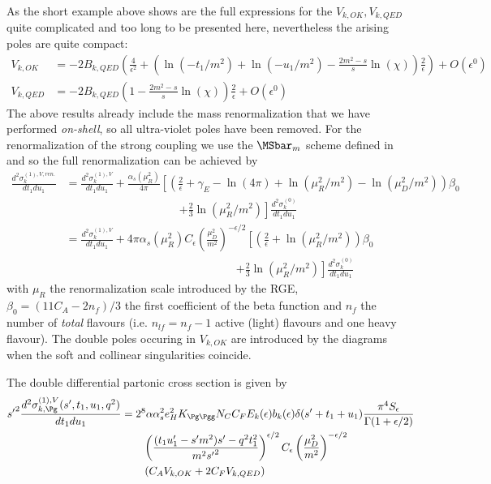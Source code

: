 As the short example above shows are the full expressions for the $V_{k,OK},V_{k,QED}$ quite complicated and too long to be presented here, nevertheless the arising poles are quite compact:
\begin{align}
V_{k,OK} &= -2B_{k,QED}\left(\frac 4 {\epsilon^2} + \left(\ln(-t_1/m^2) + \ln(-u_1/m^2) -\frac{2m^2-s}{s}\ln(\chi)\right)\frac 2 \epsilon \right) + O(\epsilon^0)\\
V_{k,QED} &= -2B_{k,QED}\left(1-\frac{2m^2-s}{s}\ln(\chi)\right)\frac 2 \epsilon + O(\epsilon^0)
\end{align}
The above results already include the mass renormalization that we have performed \textit{on-shell}, so all ultra-violet poles have been removed. For the renormalization of the strong coupling we use the $\MSbar_m$ scheme defined in \cite{Bojak:2000eu} and so the full renormalization can be achieved by
\begin{align}
\frac{d^2\sigma_{k}^{(1),V,ren.}}{dt_1du_1} &=\frac{d^2\sigma_{k}^{(1),V}}{dt_1du_1} + \frac{\alpha_s(\mu_R^2)}{4\pi}\left[\left(\frac 2 \epsilon + \gamma_E-\ln(4\pi)+\ln(\mu_R^2/m^2)-\ln(\mu_D^2/m^2)\right)\beta_0 \right.\nonumber\\
 &\hspace{120pt}\left.+\frac 2 3 \ln(\mu_R^2/m^2)\right]\frac{d^2\sigma_{k}^{(0)}}{dt_1du_1}\\
&=\frac{d^2\sigma_{k}^{(1),V}}{dt_1du_1} + 4\pi\alpha_s(\mu_R^2)C_\epsilon\left(\frac{\mu_D^2}{m^2}\right)^{-\epsilon/2}\left[\left(\frac 2 \epsilon +\ln(\mu_R^2/m^2)\right)\beta_0 \right.\nonumber\\
 &\hspace{180pt}\left.+\frac 2 3 \ln(\mu_R^2/m^2)\right]\frac{d^2\sigma_{k}^{(0)}}{dt_1du_1}
\end{align}
with $\mu_R$ the renormalization scale introduced by the RGE, $\beta_0 = (11C_A-2n_f)/3$ the first coefficient of the beta function and $n_f$ the number of \textit{total} flavours (i.e. $n_{lf}=n_f-1$ active (light) flavours and one heavy flavour). The double poles occuring in $V_{k,OK}$ are introduced by the diagrams  when the soft and collinear singularities coincide.

The double differential partonic cross section is given by
\begin{align}
{s'}^2\frac{d^2\sigma_{k,\Pg}^{(1),V}(s',t_1,u_1,q^2)}{dt_1du_1} &= 2^8\alpha\alpha_s^2 e_H^2 K_{\Pg\Pgg}N_CC_F E_k(\epsilon) b_k(\epsilon)\delta(s'+t_1+u_1) \frac{\pi^4 S_\epsilon}{\Gamma(1+\epsilon/2)}  \nonumber\\
 &\hspace{20pt} \left(\frac{(t_1u_1'-s'm^2)s' - q^2t_1^2}{m^2{s'}^2}\right)^{\epsilon/2}C_\epsilon\left(\frac{\mu_D^2}{m^2}\right)^{-\epsilon/2} \nonumber\\
 &\hspace{20pt} \left( C_A V_{k,OK} + 2C_F V_{k,QED}\right)
\end{align}
